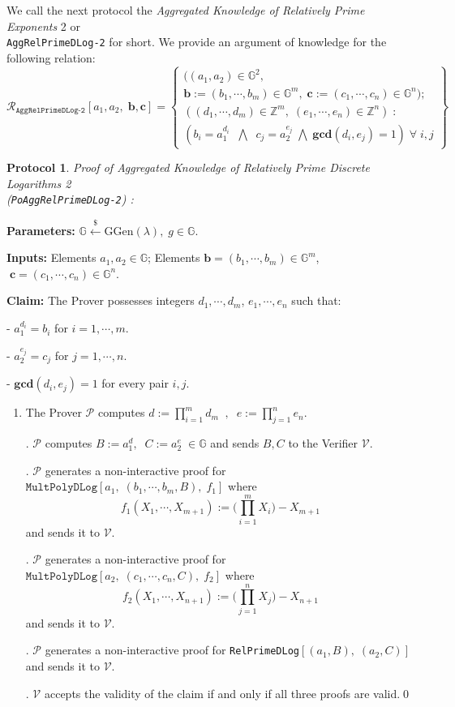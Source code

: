\documentclass[11pt, lettersize, notitlepage, leqno, footskip=0.6cm]{article}
\newcommand{\bz}{\mathbb Z}
\newcommand{\pl}{\prod\limits}
\newcommand{\ttt}{\texttt}
\newcommand{\mc}{\mathcal}
\newcommand{\mb}{\mathbb}
\newcommand{\mbf}{\mathbf}
\newcommand{\mr}{\mathrm}
\newcommand{\lamb}{\lambda}
\newcommand{\vs}{\vspace{-0.15cm}}
\newcommand{\noin}{\noindent}
\newcommand{\GCD}{\mbf{gcd}}
\newtheorem{Prot}[Thm]{Protocol}
\numberwithin{equation}{section}
\begin{document}
We call the next protocol the \textit{Aggregated Knowledge of Relatively Prime Exponents} 2 or\\ \verb|AggRelPrimeDLog-2| for short. We provide an argument of knowledge for the following relation: \[
  \mc{R}_{\ttt{AggRelPrimeDLog-2}}[a_1, a_2,\; \mbf{b}, \mbf{c}] = \left\{\begin{array}{l}
    ((a_1,a_2)\in\mb{G}^2,\;\\
     \mbf{b}:=(b_1,\cdots, b_m)\in\mb{G}^m,\;\mbf{c}:= (c_1,\cdots, c_n)\in\mb{G}^n);\\
    ((d_1,\cdots,d_m)\in\bz^m,\; (e_1,\cdots,e_n)\in\bz^n)\;: \\
    (b_i = a_1^{d_i}\;\;\bigwedge\;\; c_j = a_2^{e_j}\;\bigwedge\; \GCD(d_i, e_j) = 1)\;\forall \;i,j   	
  \end{array}\right\}
\] 


\begin{Prot} \normalfont \hypertarget{RP2}{\textit{Proof of Aggregated Knowledge of Relatively Prime Discrete Logarithms} 2}\\ (\verb|PoAggRelPrimeDLog-2|) :\end{Prot}\vspace{-0.3cm}

\noindent \textbf{Parameters:} $\mb{G}\xleftarrow{\$} \mr{GGen}(\lamb), \; g\in \mb{G}$.

\noindent \textbf{Inputs:} Elements $a_1, a_2\in \mb{G}$; Elements $\mbf{b} = (b_1,\cdots, b_m)\in\mb{G}^m$, $\;\mbf{c} = (c_1,\cdots, c_n)\in\mb{G}^n$.

\noindent \textbf{Claim:} The Prover possesses integers $d_1,\cdots, d_m$,\; $e_1,\cdots,e_n$ such that:

\noindent - $a_1^{d_i} = b_i$ for $i = 1,\cdots, m$.

\noindent - $a_2^{e_j} = c_j$ for $j = 1,\cdots, n$.

\noindent - $\GCD(d_i, e_j) = 1$ for every pair $i, j$.


\begin{enumerate}[wide, labelwidth=!, labelindent=0pt]\vs \item The Prover $\mc{P}$ computes ${d}:= \pl_{i=1}^m d_m\;\;,\;\; {e}:= \pl_{j=1}^n e_n.$ \vs

. $\mc{P}$ computes $B:= a_1^{d},\;\;C:= a_2^{e}\;\in\mb{G}$ and sends $B, C$ to the Verifier $\mc{V}$.

. $\mc{P}$ generates a non-interactive proof for $\ttt{MultPolyDLog}[a_1,\;(b_1,\cdots,b_m, B),\; f_1]$ where \vs $$f_1(X_1,\cdots, X_{m+1}):= \big(\pl_{i=1}^m X_i\big) -X_{m+1}$$ and sends it to $\mc{V}$.

\noin 4. $\mc{P}$ generates a non-interactive proof for $ \ttt{MultPolyDLog}[a_2,\;(c_1,\cdots,c_n, C),\; f_2]$ where \vs $$f_2(X_1,\cdots, X_{n+1}):= \big(\pl_{j=1}^n X_j\big) -X_{n+1}$$ and sends it to $\mc{V}$.

. $\mc{P}$ generates a non-interactive proof for \verb|RelPrimeDLog|$[(a_1, B),\;(a_2, C)]$ and sends it to $\mc{V}$. 

. $\mc{V}$ accepts the validity of the claim if and only if all three proofs are valid.\qed \end{enumerate}
\end{document}
